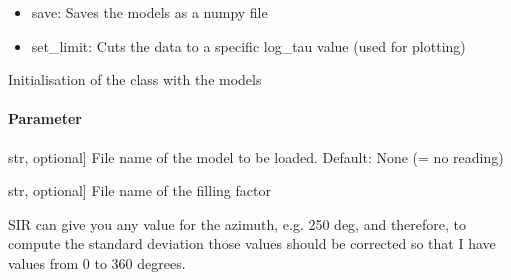\documentclass[letterpaper,10pt,english]{sphinxmanual}
\begin{document}
\begin{fulllineitems}
\begin{description}
\begin{itemize}
\item {} 
\sphinxAtStartPar
save: Saves the models as a numpy file

\item {} 
\sphinxAtStartPar
set\_limit: Cuts the data to a specific log\_tau value (used for plotting)

\end{itemize}

\end{description}

\begin{fulllineitems}
\label{\detokenize{classes:model.Model.__init__}}
\pysigstartsignatures
{}
\pysigstopsignatures
\sphinxAtStartPar
Initialisation of the class with the models


\paragraph{Parameter}
\label{\detokenize{classes:parameter}}\begin{description}
\sphinxlineitem{filename}{[}str, optional{]}
\sphinxAtStartPar
File name of the model to be loaded. Default: None (= no reading)

\sphinxlineitem{filename\_fill}{[}str, optional{]}
\sphinxAtStartPar
File name of the filling factor

\end{description}

\end{fulllineitems}


\begin{fulllineitems}
\label{\detokenize{classes:model.Model.correct_phi}}
\pysigstartsignatures
{}
\pysigstopsignatures
\sphinxAtStartPar
SIR can give you any value for the azimuth, e.g. \sphinxhyphen{}250 deg, and therefore, to compute the standard deviation
those values should be corrected so that I have values from 0 to 360 degrees.



\end{fulllineitems}
\end{fulllineitems}
\end{document}
